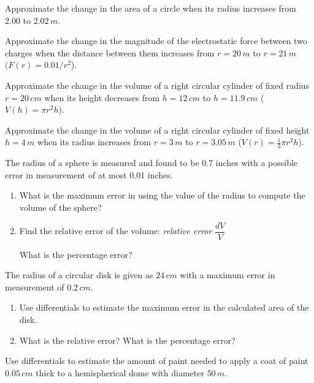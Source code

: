 \documentclass[answers]{exam}
\begin{document}
\begin{ex*}
  Approximate the change in the area of a circle when its radius increases from $2.00$ to $2.02\,m$.
\end{ex*}

\begin{ex*}
  Approximate the change in the magnitude of the electrostatic force between two charges when the distance between them increases from $r=20\,m$ to $r=21\,m$ $(F(r)=0.01/r^2$).
\end{ex*}
\pagebreak

\begin{ex*}
  Approximate the change in the volume of a right circular cylinder of fixed radius $r=20\,cm$ when its height decreases from $h=12\,cm$ to $h=11.9\,cm$ ($V(h)=\pi r^2h$).
\end{ex*}

\begin{ex*}
  Approximate the change in the volume of a right circular cylinder of fixed height $h=4\,m$ when its radius increases from $r=3\,m$ to $r=3.05\,m$ ($V(r)=\frac{1}{3}\pi r^2 h$).
\end{ex*}
\pagebreak

\begin{ex*}
  The radius of a sphere is measured and found to be $0.7$ inches with a possible error in measurement of at most 0.01 inches.
\end{ex*}
\begin{enumerate}[label=\alph*), itemsep=\stretch{1}]
  \item What is the maximum error in using the value of the radius to compute the volume of the sphere?
  \item Find the relative error of the volume: \hfill\textit{relative error} $\dfrac{dV}{V}$\hspace*{50pt}
  
  What is the percentage error?
\end{enumerate}
\pagebreak

\begin{ex*}
  The radius of a circular disk is given as $24\,cm$ with a maximum error in measurement of $0.2\,cm$.
\end{ex*}
\begin{enumerate}[label=\alph*), itemsep=\stretch{1}]
  \item Use differentials to estimate the maximum error in the calculated area of the disk.
  \item What is the relative error? What is the percentage error?
\end{enumerate}
\pagebreak

\begin{ex*}
  Use differentials to estimate the amount of paint needed to apply a coat of paint $0.05\,cm$ thick to a hemispherical dome with diameter $50\,m$.
\end{ex*}
\pagebreak
\end{document}
